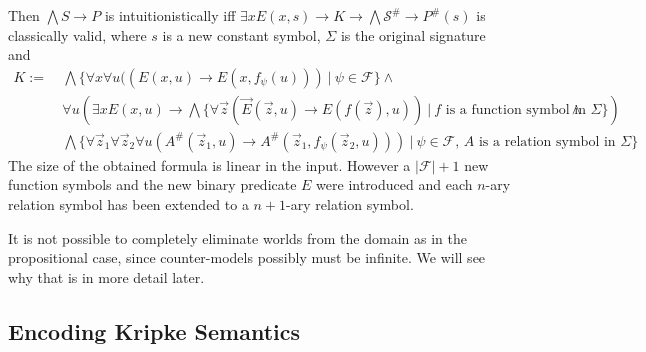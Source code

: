 \documentclass[a4paper,UKenglish,cleveref, autoref, thm-restate]{lipics-v2021}
\begin{document}
\begin{theorem}
\begin{itemize}
	\end{itemize}
	Then $\bigwedge S\to P$ is intuitionistically iff $\exists xE(x, s)\to K\to \bigwedge\mathcal S^\#\to P^\#(s)$ is classically valid, where $s$ is a new constant symbol, $\Sigma$ is the original signature and
	\begin{align*}
		K := &\:\bigwedge\{\forall x\forall u((E(x, u)\to E(x, f_\psi(u)))\:|\:\psi\in\mathcal F\}\wedge\\
		&\:\forall u\left(\exists xE(x, u)\to \bigwedge\{\forall\vec z(\vec E(\vec z, u)\to E(f(\vec z), u))\:|\:\text{$f$ is a function symbol in $\Sigma$}\}\right)\wedge\\
		&\:\bigwedge\{\forall\vec z_1\forall \vec z_2\forall u(A^\#(\vec z_1, u)\to A^\#(\vec z_1, f_\psi(\vec z_2, u)))\:|\:\text{$\psi\in\mathcal F$, $A$ is a relation symbol in $\Sigma$}\}
	\end{align*}
	The size of the obtained formula is linear in the input. However a $|\mathcal F| + 1$ new function symbols and the new binary predicate $E$ were introduced and each $n$-ary relation symbol has been extended to a $n+1$-ary relation symbol.
\end{theorem}

It is not possible to completely eliminate worlds from the domain as in the propositional case, since counter-models possibly must be infinite. We will see why that is in more detail later.

\subsection{Encoding Kripke Semantics}
\end{document}
